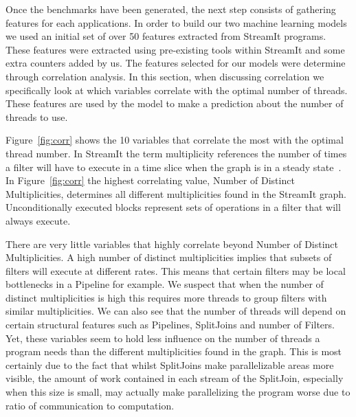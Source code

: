 Once the benchmarks have been generated, the next step consists of gathering features for each applications.
In order to build our two machine learning models we used an initial set of over 50 features extracted from StreamIt programs.
These features were extracted using pre-existing tools within StreamIt and some extra counters added by us.
The features selected for our models were determine through correlation analysis.
In this section, when discussing correlation we specifically look at which variables correlate with the optimal number of threads.
These features are used by the model to make a prediction about the number of threads to use.

Figure~\ref{fig:corr} shows the 10 variables that correlate the most with the optimal thread number.
In StreamIt the term multiplicity references the number of times a filter will have to execute in a time slice when the graph is in a steady state~\cite{gordon2002streamcomp}.
In Figure~\ref{fig:corr} the highest correlating value, Number of Distinct Multiplicities, determines all different multiplicities found in the StreamIt graph.
Unconditionally executed blocks represent sets of operations in a filter that will always execute.

There are very little variables that highly correlate beyond Number of Distinct Multiplicities.
A high number of distinct multiplicities implies that subsets of filters will execute at different rates.
This means that certain filters may be local bottlenecks in a Pipeline for example.
We suspect that when the number of distinct multiplicities is high this requires more threads to group filters with similar multiplicities.
We can also see that the number of threads will depend on certain structural features such as Pipelines, SplitJoins and number of Filters.
Yet, these variables seem to hold less influence on the number of threads a program needs than the different multiplicities found in the graph.
This is most certainly due to the fact that whilst SplitJoins make parallelizable areas more visible, the amount of work contained in each stream of the SplitJoin, especially when this size is small, may actually make parallelizing the program worse due to ratio of communication to computation.

